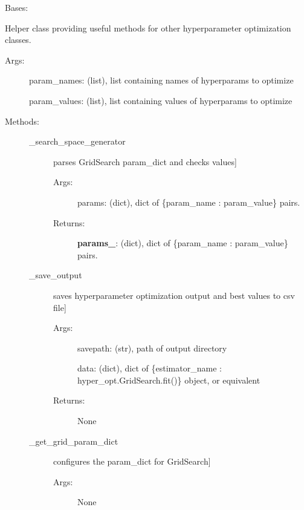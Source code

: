 \documentclass[letterpaper,10pt,english]{sphinxmanual}
\begin{document}
\begin{fulllineitems}
\label{\detokenize{api/mastml.hyper_opt.HyperOptUtils:mastml.hyper_opt.HyperOptUtils}}
Bases: 

Helper class providing useful methods for other hyperparameter optimization classes.
\begin{description}
\item[{Args:}] \leavevmode
param\_names: (list), list containing names of hyperparams to optimize

param\_values: (list), list containing values of hyperparams to optimize

\item[{Methods:}] \leavevmode\begin{description}
\item[{\_search\_space\_generator}] \leavevmode{[}parses GridSearch param\_dict and checks values{]}\begin{description}
\item[{Args:}] \leavevmode
params: (dict), dict of \{param\_name : param\_value\} pairs.

\item[{Returns:}] \leavevmode
{\color{red}\bfseries{}params\_}: (dict), dict of \{param\_name : param\_value\} pairs.

\end{description}

\item[{\_save\_output}] \leavevmode{[}saves hyperparameter optimization output and best values to csv file{]}\begin{description}
\item[{Args:}] \leavevmode
savepath: (str), path of output directory

data: (dict), dict of \{estimator\_name : hyper\_opt.GridSearch.fit()\} object, or equivalent

\item[{Returns:}] \leavevmode
None

\end{description}

\item[{\_get\_grid\_param\_dict}] \leavevmode{[}configures the param\_dict for GridSearch{]}\begin{description}
\item[{Args:}] \leavevmode
None


\end{description}
\end{description}
\end{description}
\end{fulllineitems}
\end{document}
